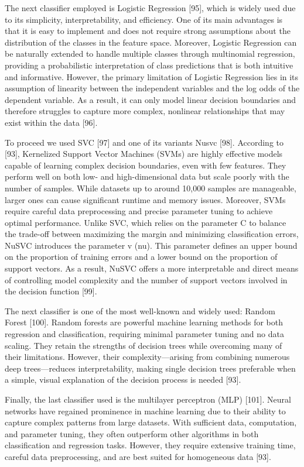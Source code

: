 \documentclass[12pt]{report}
\begin{document}
The next classifier employed is Logistic Regression [95], which is widely used due to its simplicity, interpretability, and efficiency. 
One of its main advantages is that it is easy to implement and does not require strong assumptions about the distribution of the classes in the feature space. 
Moreover, Logistic Regression can be naturally extended to handle multiple classes through multinomial regression, providing a probabilistic interpretation of class predictions that is both intuitive and informative.
However, the primary limitation of Logistic Regression lies in its assumption of linearity between the independent variables and the log odds of the dependent variable. 
As a result, it can only model linear decision boundaries and therefore struggles to capture more complex, nonlinear relationships that may exist within the data [96].

To proceed we used SVC [97] and one of its variants Nusvc [98].
According to [93], Kernelized Support Vector Machines (SVMs) are highly effective models capable of learning complex decision boundaries, even with few features. 
They perform well on both low- and high-dimensional data but scale poorly with the number of samples. 
While datasets up to around 10,000 samples are manageable, larger ones can cause significant runtime and memory issues. 
Moreover, SVMs require careful data preprocessing and precise parameter tuning to achieve optimal performance.
Unlike SVC, which relies on the parameter C to balance the trade-off between maximizing the margin and minimizing classification errors, NuSVC introduces the parameter v (nu).
This parameter defines an upper bound on the proportion of training errors and a lower bound on the proportion of support vectors. 
As a result, NuSVC offers a more interpretable and direct means of controlling model complexity and the number of support vectors involved in the decision function [99].

The next classifier is one of the most well-known and widely used: Random Forest [100].
Random forests are powerful machine learning methods for both regression and classification, requiring minimal parameter tuning and no data scaling. 
They retain the strengths of decision trees while overcoming many of their limitations. 
However, their complexity—arising from combining numerous deep trees—reduces interpretability, making single decision trees preferable when a simple, visual explanation of the decision process is needed [93].

Finally, the last classifier used is the multilayer perceptron (MLP) [101]. 
Neural networks have regained prominence in machine learning due to their ability to capture complex patterns from large datasets. 
With sufficient data, computation, and parameter tuning, they often outperform other algorithms in both classification and regression tasks. 
However, they require extensive training time, careful data preprocessing, and are best suited for homogeneous data [93]. 
\end{document}

